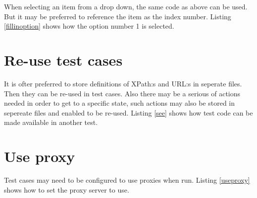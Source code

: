 \documentclass[a4paper,11pt]{kth-mag}
\begin{document}
\lstset{basicstyle=\footnotesize, caption=Fill in text field in formular with unique string of specific length and start, label=fillinuniquelengthstart, numbers=left, frame=single, captionpos=b, breaklines=true}


When selecting an item from a drop down, the same code as above can be used. But it may be preferred to reference the item as the index number. Listing \ref{fillinoption} shows how the option number 1 is selected.

\lstset{basicstyle=\footnotesize, caption=Fill in option by index number, label=fillinoption, numbers=left, frame=single, captionpos=b, breaklines=true}


\section{Re-use test cases}
It is ofter preferred to store definitions of XPath:s and URL:s in seperate files. Then they can be re-used in test cases. Also there may be a serious of actions needed in order to get to a specific state, such actions may also be stored in sepereate files and enabled to be re-used. Listing \ref{see} shows how test code can be made available in another test.

\lstset{basicstyle=\footnotesize, caption=See statement, label=see, numbers=left, frame=single, captionpos=b, breaklines=true}


\section{Use proxy}
Test cases may need to be configured to use proxies when run. Listing \ref{useproxy} shows how to set the proxy server to use.

\lstset{basicstyle=\footnotesize, caption=Use proxy statement, label=useproxy, numbers=left, frame=single, captionpos=b, breaklines=true}

\end{document}
